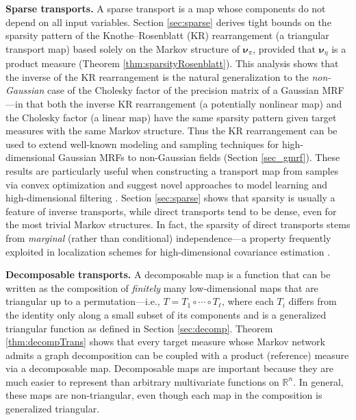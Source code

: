 \documentclass[twoside,11pt]{article}
\newcommand{\genm}{\boldsymbol{\nu} }   %
\newcommand{\re}{\mathbb{R}}
\begin{document}
%
%
%
%
%
%
%
%
%
%
%
%
%
%
%
%
%
%
%
%
%
%
%
%


%
%
%

{\bf Sparse transports.}
A sparse transport is a map whose components do not depend on all
input variables. Section \ref{sec:sparse} derives tight bounds on the
sparsity pattern of the Knothe--Rosenblatt (KR) rearrangement (a
triangular transport map) based solely on the Markov structure of
$\genm_\pi$, provided that $\genm_\eta$ is a %
product 
%
measure (Theorem \ref{thm:sparsityRosenblatt}). This analysis shows
that the inverse of the KR rearrangement
%
%
%
is the
natural generalization to the {\it non-Gaussian} case of the
Cholesky factor  
of the precision 
matrix 
of a Gaussian
MRF---in that
%
both the
inverse KR rearrangement (a potentially nonlinear map) and the Cholesky factor (a linear map)
have 
the same sparsity pattern given 
target
measures
with the 
same Markov structure.
Thus %
%
the KR rearrangement can be used to extend 
well-known modeling and sampling techniques for
high-dimensional Gaussian MRFs  \citep{rue2005gaussian} 
to non-Gaussian fields (Section \ref{sec_gmrf}).
These results are particularly useful when constructing a transport map
from samples via convex optimization \citep{parno2015transport} and suggest
novel approaches to model learning \citep{morrison2017beyond} and high-dimensional filtering
\citep[Ch.~6]{spantini2017inference}.
%
Section \ref{sec:sparse} 
shows that sparsity is usually a feature of inverse transports,
while direct transports tend to be dense, even for the
most trivial Markov structures.
%
%
In fact, the sparsity of direct transports stems from
\textit{marginal}
 (rather than conditional) independence---a property
frequently exploited in localization schemes for
high-dimensional covariance estimation \citep{gaspari1999construction,hamill2001distance}.
%
%
%
%
%
%
%
%
%
%
%
%
%

%
{\bf  Decomposable transports.}
%
A decomposable map is
a function that can be written as the %
composition of {\it finitely} many 
low-dimensional 
%
%
%
maps that
are triangular up to a permutation---i.e., 
$T=T_1 \circ \cdots \circ T_\ell$, where  each %
$T_i$ differs from the identity only along a small subset of its
components and is a generalized triangular function as
defined in Section \ref{sec:decomp}.
%
%
%
Theorem \ref{thm:decompTrans} shows 
that every target measure %
whose Markov network admits
a graph decomposition can be coupled 
with a %
product
(reference) measure %
 via a decomposable map.
Decomposable maps are important because
they are 
much easier to represent than 
arbitrary multivariate functions on $\re^n$. 
%
%
%
%
%
%
%
%
In general, these maps are non-triangular, even though %
each map in the composition is generalized triangular.
%
%
%
%
%
%
%
%
%
%
%
%
%
\end{document}
